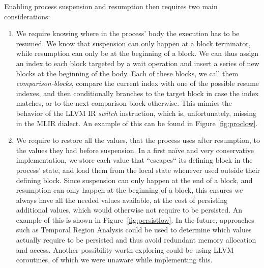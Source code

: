 Enabling process suspension and resumption then requires two main considerations:
\begin{enumerate}
    \item We require knowing where in the process' body the execution has to be resumed. We know that suspension can only happen at a block terminator, while resumption can only be at the beginning of a block. We can thus assign an index to each block targeted by a wait operation and insert a series of new blocks at the beginning of the body. Each of these blocks, we call them \textit{comparison-blocks}, compare the current index with one of the possible resume indexes, and then conditionally branches to the target block in case the index matches, or to the next comparison block otherwise. This mimics the behavior of the LLVM IR \textit{switch} instruction, which is, unfortunately, missing in the MLIR dialect. An example of this can be found in Figure \ref{fig:proclow}.
    \item We require to restore all the values, that the process uses after resumption, to the values they had before suspension. In a first naïve and very conservative implementation, we store each value that “escapes“ its defining block in the process' state, and load them from the local state whenever used outside their defining block. Since suspension can only happen at the end of a block, and resumption can only happen at the beginning of a block, this ensures we always have all the needed values available, at the cost of persisting additional values, which would otherwise not require to be persisted.  An example of this is shown in Figure~\ref{fig:persistlow}.
          In the future, approaches such as Temporal Region Analysis could be used to determine which values actually require to be persisted and thus avoid redundant memory allocation and access. Another possibility worth exploring could be using LLVM coroutines, of which we were unaware while implementing this.
\end{enumerate}

